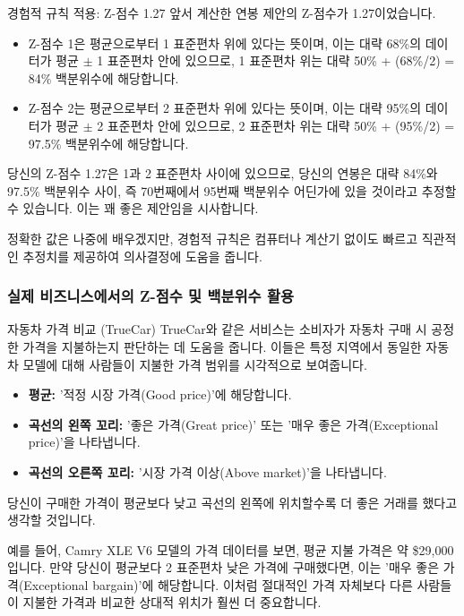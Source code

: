 \documentclass[11pt,a4paper]{article}
\begin{document}
\begin{examplebox}{경험적 규칙 적용: Z-점수 1.27}
앞서 계산한 연봉 제안의 Z-점수가 1.27이었습니다.
\begin{itemize}
    \item Z-점수 1은 평균으로부터 1 표준편차 위에 있다는 뜻이며, 이는 대략 68\%의 데이터가 평균 \(\pm\) 1 표준편차 안에 있으므로, 1 표준편차 위는 대략 50\% + (68\%/2) = 84\% 백분위수에 해당합니다.
    \item Z-점수 2는 평균으로부터 2 표준편차 위에 있다는 뜻이며, 이는 대략 95\%의 데이터가 평균 \(\pm\) 2 표준편차 안에 있으므로, 2 표준편차 위는 대략 50\% + (95\%/2) = 97.5\% 백분위수에 해당합니다.
\end{itemize}
당신의 Z-점수 1.27은 1과 2 표준편차 사이에 있으므로, 당신의 연봉은 대략 84\%와 97.5\% 백분위수 사이, 즉 70번째에서 95번째 백분위수 어딘가에 있을 것이라고 추정할 수 있습니다. 이는 꽤 좋은 제안임을 시사합니다.

정확한 값은 나중에 배우겠지만, 경험적 규칙은 컴퓨터나 계산기 없이도 빠르고 직관적인 추정치를 제공하여 의사결정에 도움을 줍니다.
\end{examplebox}

\subsubsection*{실제 비즈니스에서의 Z-점수 및 백분위수 활용}

\begin{examplebox}{자동차 가격 비교 (TrueCar)}
TrueCar와 같은 서비스는 소비자가 자동차 구매 시 공정한 가격을 지불하는지 판단하는 데 도움을 줍니다. 이들은 특정 지역에서 동일한 자동차 모델에 대해 사람들이 지불한 가격 범위를 시각적으로 보여줍니다.
\begin{itemize}
    \item \textbf{평균:} '적정 시장 가격(Good price)'에 해당합니다.
    \item \textbf{곡선의 왼쪽 꼬리:} '좋은 가격(Great price)' 또는 '매우 좋은 가격(Exceptional price)'을 나타냅니다.
    \item \textbf{곡선의 오른쪽 꼬리:} '시장 가격 이상(Above market)'을 나타냅니다.
\end{itemize}
당신이 구매한 가격이 평균보다 낮고 곡선의 왼쪽에 위치할수록 더 좋은 거래를 했다고 생각할 것입니다.

예를 들어, Camry XLE V6 모델의 가격 데이터를 보면, 평균 지불 가격은 약 \$29,000입니다. 만약 당신이 평균보다 2 표준편차 낮은 가격에 구매했다면, 이는 '매우 좋은 가격(Exceptional bargain)'에 해당합니다. 이처럼 절대적인 가격 자체보다 다른 사람들이 지불한 가격과 비교한 상대적 위치가 훨씬 더 중요합니다.
\end{examplebox}
\end{document}
